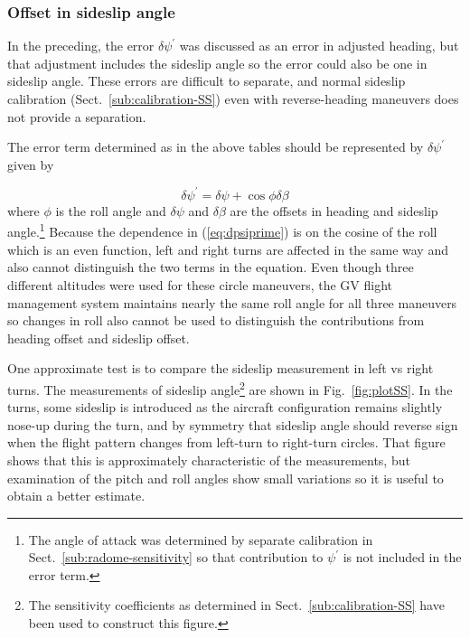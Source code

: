 \documentclass[12pt,twoside,english]{article}\usepackage[]{graphicx}\usepackage[]{color}
\begin{document}
\subsubsection{Offset in sideslip angle\label{sub:Offset-in-Sideslip}}

In the preceding, the error $\delta\psi^{\prime}$ was discussed as an error in adjusted heading, but that adjustment includes the sideslip angle so the error could also be one in sideslip angle. These errors are difficult to separate, and normal sideslip calibration (Sect.~\ref{sub:calibration-SS}) even with reverse-heading maneuvers does not provide a separation. 

The error term determined as in the above tables should be represented by $\delta\psi^{\prime}$ given by 

\begin{equation}
\delta\psi^{\prime}=\delta\psi+\cos\phi\delta\beta\label{eq:dpsiprime} 
\end{equation}
where $\phi$ is the roll angle and $\delta\psi$ and $\delta\beta$ are the offsets in heading and sideslip angle.\footnote{The angle of attack was determined by separate calibration in Sect.~\ref{sub:radome-sensitivity} so that contribution to $\psi^{\prime}$ is not included in the error term.} Because the dependence in (\ref{eq:dpsiprime}) is on the cosine of the roll which is an even function, left and right turns are affected in the same way and also cannot distinguish the two terms in the equation. Even though three different altitudes were used for these circle maneuvers, the GV flight management system maintains nearly the same roll angle for all three maneuvers so changes in roll also cannot be used to distinguish the contributions from heading offset and sideslip offset. 

One approximate test is to compare the sideslip measurement in left vs right turns. The measurements of sideslip angle\footnote{The sensitivity coefficients as determined in Sect.~\ref{sub:calibration-SS} have been used to construct this figure.} are shown in Fig.~\ref{fig:plotSS}. In the turns, some sideslip is introduced as the aircraft configuration remains slightly nose-up during the turn, and by symmetry that sideslip angle should reverse sign when the flight pattern changes from left-turn to right-turn circles. That figure shows that this is approximately characteristic of the measurements, but examination of the pitch and roll angles show small variations so it is useful to obtain a better estimate.
\end{document}
